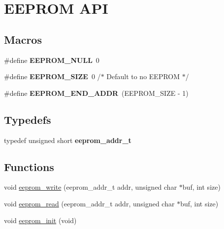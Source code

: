 \hypertarget{group__eeprom}{}\section{E\+E\+P\+R\+O\+M A\+P\+I}
\label{group__eeprom}
\subsection*{Macros}
\begin{DoxyCompactItemize}
\item 
\hypertarget{group__eeprom_ga3a1c69b139c3985a63a47df263c22eb1}{}\#define {\bfseries E\+E\+P\+R\+O\+M\+\_\+\+N\+U\+L\+L}~0\label{group__eeprom_ga3a1c69b139c3985a63a47df263c22eb1}

\item 
\hypertarget{group__eeprom_gae3ef7bba113f663df6996f286b632a3f}{}\#define {\bfseries E\+E\+P\+R\+O\+M\+\_\+\+S\+I\+Z\+E}~0 /$\ast$ Default to no E\+E\+P\+R\+O\+M $\ast$/\label{group__eeprom_gae3ef7bba113f663df6996f286b632a3f}

\item 
\hypertarget{group__eeprom_ga234e4f1294ec845752e1cb4b1dcd7add}{}\#define {\bfseries E\+E\+P\+R\+O\+M\+\_\+\+E\+N\+D\+\_\+\+A\+D\+D\+R}~(E\+E\+P\+R\+O\+M\+\_\+\+S\+I\+Z\+E -\/ 1)\label{group__eeprom_ga234e4f1294ec845752e1cb4b1dcd7add}

\end{DoxyCompactItemize}
\subsection*{Typedefs}
\begin{DoxyCompactItemize}
\item 
\hypertarget{group__eeprom_ga5825c96b624f47244f64b3e2b9ea39b9}{}typedef unsigned short {\bfseries eeprom\+\_\+addr\+\_\+t}\label{group__eeprom_ga5825c96b624f47244f64b3e2b9ea39b9}

\end{DoxyCompactItemize}
\subsection*{Functions}
\begin{DoxyCompactItemize}
\item 
void \hyperlink{group__eeprom_gac78250ee593cc00686f8b6209b48a745}{eeprom\+\_\+write} (eeprom\+\_\+addr\+\_\+t addr, unsigned char $\ast$buf, int size)
\item 
void \hyperlink{group__eeprom_ga273489bf4a99139d385b3d01ac596644}{eeprom\+\_\+read} (eeprom\+\_\+addr\+\_\+t addr, unsigned char $\ast$buf, int size)
\item 
void \hyperlink{group__eeprom_ga4ec7f9d780da432051aa74ec5892a94c}{eeprom\+\_\+init} (void)
\end{DoxyCompactItemize}


